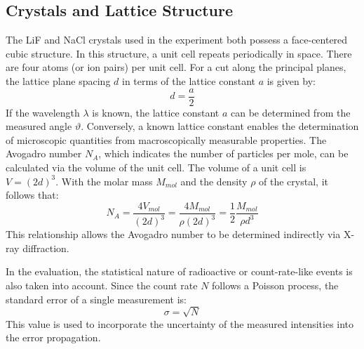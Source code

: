 \subsection{Crystals and Lattice Structure}
The LiF and NaCl crystals used in the experiment both possess a face-centered cubic structure. In this structure, a unit cell repeats periodically in space. There are four atoms (or ion pairs) per unit cell. For a cut along the principal planes, the lattice plane spacing \(d\) in terms of the lattice constant \(a\) is given by:
\begin{equation} \label{eq:netzebene}
    d = \frac{a}{2}
\end{equation}
If the wavelength \(\lambda\) is known, the lattice constant \(a\) can be determined from the measured angle \(\vartheta\). Conversely, a known lattice constant enables the determination of microscopic quantities from macroscopically measurable properties. The Avogadro number \(N_A\), which indicates the number of particles per mole, can be calculated via the volume of the unit cell. The volume of a unit cell is \(V = (2d)^3\). With the molar mass \(M_{mol}\) and the density \(\rho\) of the crystal, it follows that:
\begin{equation} \label{eq:avogadro}
    N_A = \frac{4 V_{mol}}{(2d)^3} = \frac{4 M_{mol}}{\rho (2d)^3} = \frac{1}{2} \frac{M_{mol}}{\rho d^3}
\end{equation}
This relationship allows the Avogadro number to be determined indirectly via X-ray diffraction.

In the evaluation, the statistical nature of radioactive or count-rate-like events is also taken into account. Since the count rate \(N\) follows a Poisson process, the standard error of a single measurement is:
\begin{equation} \label{eq:fehler_zahl}
    \sigma = \sqrt{N}
\end{equation}
This value is used to incorporate the uncertainty of the measured intensities into the error propagation.





